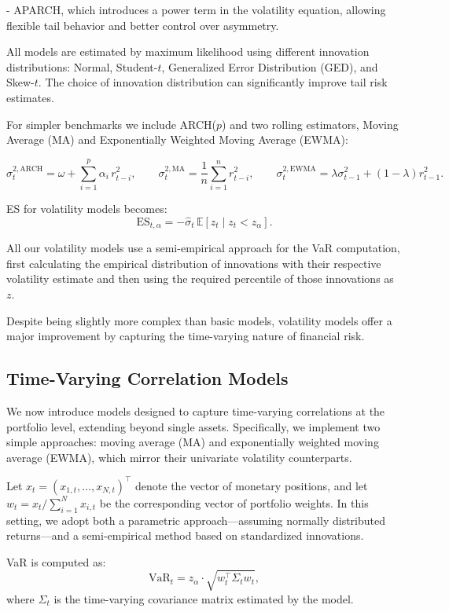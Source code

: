 \documentclass[12pt]{article}
\begin{document}
- APARCH, which introduces a power term in the volatility equation, allowing flexible tail behavior and better control over asymmetry.

All models are estimated by maximum likelihood using different innovation distributions: Normal, Student-\( t \), Generalized Error Distribution (GED), and Skew-\( t \). The choice of innovation distribution can significantly improve tail risk estimates.

For simpler benchmarks we include ARCH(\( p \)) and two rolling estimators, Moving Average (MA) and Exponentially Weighted Moving Average (EWMA):

\[
\sigma_{t}^{2,\mathrm{ARCH}}=\omega+\sum_{i=1}^{p} \alpha_{i}\, r_{t-i}^{2},\qquad
\sigma_{t}^{2,\mathrm{MA}}=\frac{1}{n}\sum_{i=1}^{n} r_{t-i}^{2},\qquad
\sigma_{t}^{2,\mathrm{EWMA}}=\lambda \sigma_{t-1}^{2}+(1-\lambda) r_{t-1}^{2}.
\]

ES for volatility models becomes:
\[
  \text{ES}_{t,\alpha} = -\hat{\sigma}_t \, \mathbb{E}[z_t \mid z_t < z_\alpha].
\] 

All our volatility models use a semi-empirical approach for the VaR computation, first calculating the empirical distribution of innovations with their respective volatility estimate and then using the required percentile of those innovations as \( z \).

Despite being slightly more complex than basic models, volatility models offer a major improvement by capturing the time-varying nature of financial risk.


\subsection{Time-Varying Correlation Models}

We now introduce models designed to capture time-varying correlations at the portfolio level, extending beyond single assets. Specifically, we implement two simple approaches: moving average (MA) and exponentially weighted moving average (EWMA), which mirror their univariate volatility counterparts.

Let \( x_t = (x_{1,t}, \dots, x_{N,t})^\top \) denote the vector of monetary positions, and let \( w_t = x_t / \sum_{i=1}^N x_{i,t} \) be the corresponding vector of portfolio weights. In this setting, we adopt both a parametric approach—assuming normally distributed returns—and a semi-empirical method based on standardized innovations.

VaR is computed as:
\[
\text{VaR}_t = z_\alpha \cdot \sqrt{w_t^\top \Sigma_t w_t},
\]
where \( \Sigma_t \) is the time-varying covariance matrix estimated by the model.
\end{document}
